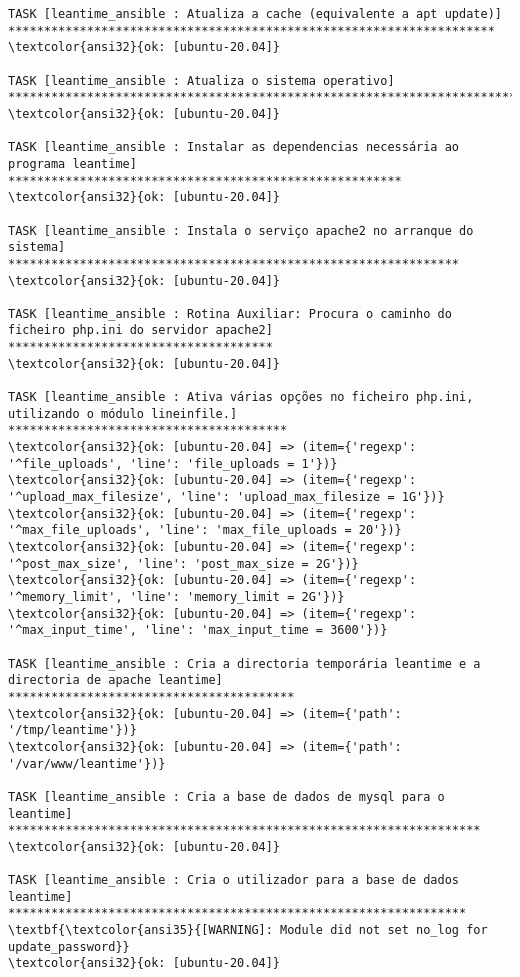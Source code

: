 \documentclass{scrartcl}
\begin{document}
\begin{Verbatim}
TASK [leantime_ansible : Atualiza a cache (equivalente a apt update)] ********************************************************************
\textcolor{ansi32}{ok: [ubuntu-20.04]}

TASK [leantime_ansible : Atualiza o sistema operativo] ***********************************************************************************
\textcolor{ansi32}{ok: [ubuntu-20.04]}

TASK [leantime_ansible : Instalar as dependencias necessária ao programa leantime] *******************************************************
\textcolor{ansi32}{ok: [ubuntu-20.04]}

TASK [leantime_ansible : Instala o serviço apache2 no arranque do sistema] ***************************************************************
\textcolor{ansi32}{ok: [ubuntu-20.04]}

TASK [leantime_ansible : Rotina Auxiliar: Procura o caminho do ficheiro php.ini do servidor apache2] *************************************
\textcolor{ansi32}{ok: [ubuntu-20.04]}

TASK [leantime_ansible : Ativa várias opções no ficheiro php.ini, utilizando o módulo lineinfile.] ***************************************
\textcolor{ansi32}{ok: [ubuntu-20.04] => (item={'regexp': '^file_uploads', 'line': 'file_uploads = 1'})}
\textcolor{ansi32}{ok: [ubuntu-20.04] => (item={'regexp': '^upload_max_filesize', 'line': 'upload_max_filesize = 1G'})}
\textcolor{ansi32}{ok: [ubuntu-20.04] => (item={'regexp': '^max_file_uploads', 'line': 'max_file_uploads = 20'})}
\textcolor{ansi32}{ok: [ubuntu-20.04] => (item={'regexp': '^post_max_size', 'line': 'post_max_size = 2G'})}
\textcolor{ansi32}{ok: [ubuntu-20.04] => (item={'regexp': '^memory_limit', 'line': 'memory_limit = 2G'})}
\textcolor{ansi32}{ok: [ubuntu-20.04] => (item={'regexp': '^max_input_time', 'line': 'max_input_time = 3600'})}

TASK [leantime_ansible : Cria a directoria temporária leantime e a directoria de apache leantime] ****************************************
\textcolor{ansi32}{ok: [ubuntu-20.04] => (item={'path': '/tmp/leantime'})}
\textcolor{ansi32}{ok: [ubuntu-20.04] => (item={'path': '/var/www/leantime'})}

TASK [leantime_ansible : Cria a base de dados de mysql para o leantime] ******************************************************************
\textcolor{ansi32}{ok: [ubuntu-20.04]}

TASK [leantime_ansible : Cria o utilizador para a base de dados leantime] ****************************************************************
\textbf{\textcolor{ansi35}{[WARNING]: Module did not set no_log for update_password}}
\textcolor{ansi32}{ok: [ubuntu-20.04]}


\end{Verbatim}
\end{document}
